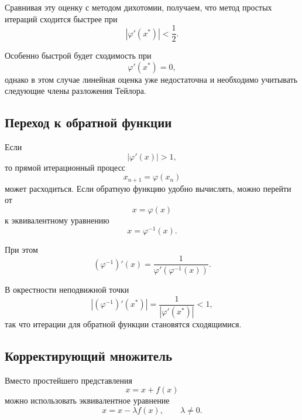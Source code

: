 \documentclass[../final.tex]{subfiles}
\begin{document}
Сравнивая эту оценку с методом дихотомии, получаем, что метод
простых итераций сходится быстрее при
%
\begin{equation*}
    |\varphi'(x^*)|<\frac12.
\end{equation*}

Особенно быстрой будет сходимость при
%
\begin{equation*}
    \varphi'(x^*)=0,
\end{equation*}
%
однако в этом случае линейная оценка уже недостаточна и необходимо
учитывать следующие члены разложения Тейлора.


\subsection{Переход к обратной функции}

Если
%
\begin{equation*}
    |\varphi'(x)|>1,
\end{equation*}
%
то прямой итерационный процесс
%
\begin{equation*}
    x_{n+1}=\varphi(x_n)
\end{equation*}
%
может расходиться. Если обратную функцию удобно вычислять, можно
перейти от
%
\begin{equation*}
    x=\varphi(x)
\end{equation*}
%
к эквивалентному уравнению
%
\begin{equation*}
    x=\varphi^{-1}(x).
\end{equation*}

При этом
%
\begin{equation*}
    (\varphi^{-1})'(x)
    =
    \frac{1}{\varphi'(\varphi^{-1}(x))}.
\end{equation*}

В окрестности неподвижной точки
%
\begin{equation*}
    |(\varphi^{-1})'(x^*)|
    =
    \frac{1}{|\varphi'(x^*)|}
    <1,
\end{equation*}
%
так что итерации для обратной функции становятся сходящимися.


\subsection{Корректирующий множитель}

Вместо простейшего представления
%
\begin{equation*}
    x=x+f(x)
\end{equation*}
%
можно использовать эквивалентное уравнение
%
\begin{equation*}
    x=x-\lambda f(x),
    \qquad
    \lambda\neq0.
\end{equation*}
\end{document}
